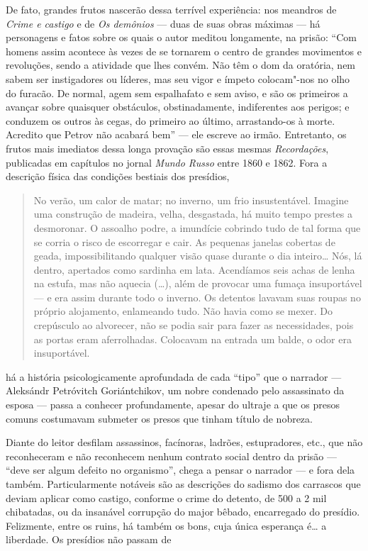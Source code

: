 De fato, grandes frutos nascerão dessa terrível
experiência: nos meandros de \emph{Crime e castigo} e de \emph{Os
demônios} --- duas de suas obras máximas --- há personagens e fatos sobre
os quais o autor meditou longamente, na prisão: ``Com homens assim
acontece às vezes de se tornarem o centro de grandes movimentos e
revoluções, sendo a atividade que lhes convém. Não têm o dom da
oratória, nem sabem ser instigadores ou líderes, mas seu vigor e ímpeto
colocam"-nos no olho do furacão. De normal, agem sem espalhafato e sem
aviso, e são os primeiros a avançar sobre quaisquer obstáculos,
obstinadamente, indiferentes aos perigos; e conduzem os outros às cegas,
do primeiro ao último, arrastando-os à morte. Acredito que Petrov não
acabará bem'' --- ele escreve ao irmão. Entretanto, os frutos mais
imediatos dessa longa provação são essas mesmas \emph{Recordações},
publicadas em capítulos no jornal \emph{Mundo Russo} entre 1860 e 1862.
Fora a descrição física das condições bestiais dos presídios,

\begin{quote}
No verão, um calor de matar; no inverno, um frio insustentável.
Imagine uma construção de madeira, velha, desgastada, há muito tempo
prestes a desmoronar. O assoalho podre, a imundície cobrindo tudo de tal
forma que se corria o risco de escorregar e cair. As pequenas janelas
cobertas de geada, impossibilitando qualquer visão quase durante o dia
inteiro\ldots{} Nós, lá dentro, apertados como sardinha em lata. Acendíamos
seis achas de lenha na estufa, mas não aquecia (\ldots{}), além de provocar
uma fumaça insuportável --- e era assim durante todo o inverno. Os
detentos lavavam suas roupas no próprio alojamento, enlameando tudo. Não
havia como se mexer. Do crepúsculo ao alvorecer, não se podia sair para
fazer as necessidades, pois as portas eram aferrolhadas. Colocavam na
entrada um balde, o odor era insuportável.
\end{quote}

há a história psicologicamente aprofundada de cada ``tipo'' que o narrador
--- Aleksándr Petróvitch Goriántchikov, um nobre condenado pelo assassinato
da esposa --- passa a conhecer profundamente, apesar do ultraje a que
os presos comuns costumavam submeter os presos que tinham título de
nobreza.

Diante do leitor desfilam assassinos, facínoras, ladrões, estupradores,
etc., que não reconheceram e não reconhecem nenhum contrato social
dentro da prisão --- ``deve ser algum defeito no organismo'', chega a
pensar o narrador --- e fora dela também. Particularmente notáveis são as
descrições do sadismo dos carrascos que deviam aplicar como
castigo, conforme o crime do detento, de 500 a 2 mil chibatadas, ou da
insanável corrupção do major bêbado, encarregado do presídio. Felizmente,
entre os ruins, há também os bons, cuja única esperança é\ldots{} a liberdade.
Os presídios não passam de

